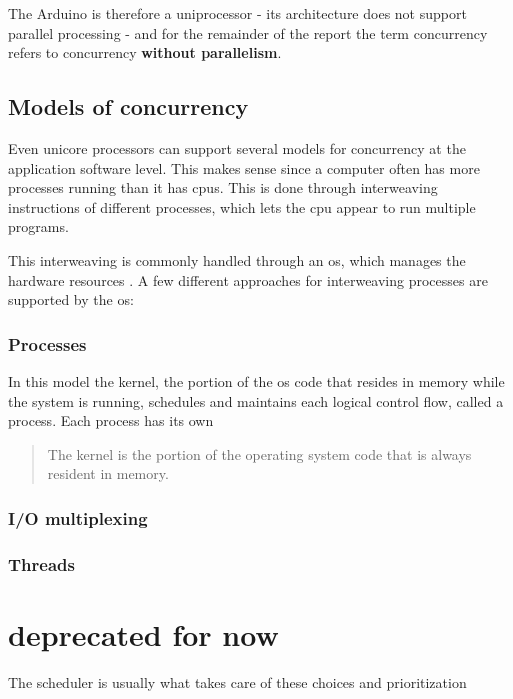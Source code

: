 The Arduino is therefore a uniprocessor\cite{Bryant2016} - its architecture does not support parallel processing - and for the remainder of the report the term concurrency refers to concurrency \textbf{without parallelism}.

\subsection{Models of concurrency}\label{subsec:modelsofcon}
Even unicore processors can support several models for concurrency at the application software level. This makes sense since a computer often has more processes running than it has \glspl{cpu}. This is done through interweaving instructions of different processes, which lets the \gls{cpu} appear to run multiple programs.

This interweaving is commonly handled through an \gls{os}, which manages the hardware resources \cite{Bryant2016}. A few different approaches for interweaving processes are supported by the \gls{os}:

\subsubsection{Processes}
In this model the kernel, the portion of the \gls{os} code that resides in memory while the system is running, schedules and maintains each logical control flow, called a process. Each process has its own 

\blockcquote{Bryant2016}{The kernel is the portion of the operating system code that is always resident in memory.}


\subsubsection{I/O multiplexing}


\subsubsection{Threads}







\section*{deprecated for now}
The scheduler is usually what takes care of these choices and prioritization

